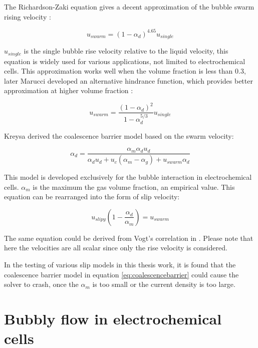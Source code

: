 The Richardson-Zaki equation gives a decent approximation of the bubble swarm rising velocity \cite{richardson1954sedimentation}:

\begin{equation}\label{eq:richardson}
    u_{swarm} = (1-\alpha_d)^{4.65} u_{single}
\end{equation}

$u_{single}$ is the single bubble rise velocity relative to the liquid velocity, this equation is widely used for various applications, not limited to electrochemical cells. This approximation works well when the volume fraction is less than 0.3, later Marucci developed an alternative hindrance function, which provides better approximation at higher volume fraction \cite{wendt1999electrochemical}:

\begin{equation}
    u_{swarm} =\frac{(1-\alpha_d)^2}{1-\alpha_d^{5/3}}  u_{single}
\end{equation}

Kreysa \cite{Kreysa1985} derived the coalescence barrier model based on the swarm velocity:

\begin{equation}
   \alpha_d = \frac{\alpha_m \alpha_d u_d}{\alpha_d u_d+u_c(\alpha_m-\alpha_g)+u_{swarm}\alpha_d}
\end{equation}

This model is developed exclusively for the bubble interaction in electrochemical cells. $\alpha_m$ is the maximum the gas volume fraction, an empirical value. This equation can be rearranged into the form of slip velocity:

\begin{equation}\label{eq:coalescencebarrier}
    u_{slipy}(1-\frac{\alpha_d}{\alpha_m}) = u_{swarm}
\end{equation}

The same equation could be derived from Vogt's correlation in \cite{Energy}. Please note that here the velocities are all scalar since only the rise velocity is considered. 

In the testing of various slip models in this thesis work, it is found that the coalescence barrier model in equation \ref{eq:coalescencebarrier} could cause the solver to crash, once the $\alpha_m$ is too small or the current density is too large. 



\section{Bubbly flow in electrochemical cells}

